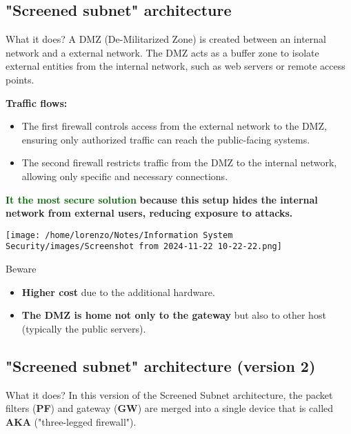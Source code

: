 \subsection{"Screened subnet" architecture} 
\vspace{0.2cm}
\begin{quotebox-yellow}{What it does?}
A DMZ (De-Militarized Zone) is created between an internal network and a external network.
The DMZ  acts as a buffer zone to isolate external entities from the internal network, such as web servers or remote access points.
\end{quotebox-yellow}
\begin{minipage}{0.5\textwidth}
    \textbf{Traffic flows:}
    \begin{itemize}
        \item The first firewall controls access from the external network to the DMZ, ensuring only authorized traffic can reach the public-facing systems.
        \item The second firewall restricts traffic from the DMZ to the internal network, allowing only specific and necessary connections.
    \end{itemize}
    \textcolor{darkgreen}{\textbf{It the most secure solution}} \textbf{because this setup hides the internal network from external users, reducing exposure to attacks.}
\end{minipage} 
\hfill
\begin{minipage}{0.5\textwidth}
    \centering
    \texttt{[image: 
        /home/lorenzo/Notes/Information System Security/images/Screenshot from 2024-11-22 10-22-22.png]}
\end{minipage}


\begin{center}
    \begin{quotebox-red}{Beware}
      \begin{itemize}
        \item \textbf{Higher cost} due to the additional hardware.
        \item \textbf{The DMZ is home not only to the gateway} but also to other host (typically the public servers).
      \end{itemize} 
    \end{quotebox-red}   
\end{center}
\newpage
\subsection{"Screened subnet" architecture (version 2)}
\vspace{0.2cm}
\begin{quotebox-yellow}{What it does?}
    In this version of the Screened Subnet architecture, the packet filters (\textbf{PF}) and gateway (\textbf{GW}) are merged into a single device that is called \textbf{AKA} ("three-legged firewall").
\end{quotebox-yellow}


